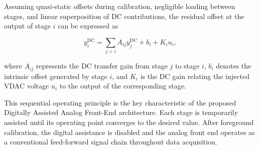 Assuming quasi-static offsets during calibration, negligible loading between stages, and linear superposition of DC contributions, the residual offset at the output of stage $i$ can be expressed as

\begin{equation}
 y_i^{\mathrm{DC}} =
 \sum_{j<i} A_{ij}y_j^{\mathrm{DC}}
 + b_i
 + K_i u_i,
 \label{eq:stage}
\end{equation}

where $A_{ij}$ represents the DC transfer gain from stage $j$ to stage $i$, $b_i$ denotes the intrinsic offset generated by stage $i$, and $K_i$ is the DC gain relating the injected VDAC voltage $u_i$ to the output of the corresponding stage.

This sequential operating principle is the key characteristic of the proposed Digitally Assisted Analog Front-End architecture. Each stage is temporarily assisted until its operating point converges to the desired value. After foreground calibration, the digital assistance is disabled and the analog front end operates as a conventional feed-forward signal chain throughout data acquisition.